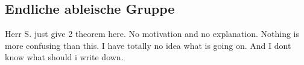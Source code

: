 \subsection{Endliche ableische Gruppe}

Herr S. just give 2 theorem here. No motivation and no explanation. Nothing is more confusing than this. I have totally no idea what is going on. And I dont know what should i write down.